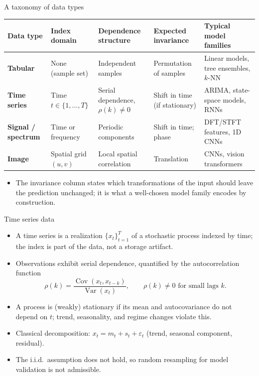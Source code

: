 \begin{frame}{A taxonomy of data types}
\begingroup\footnotesize
\begin{tabularx}{\textwidth}{>{\bfseries}l >{\raggedright\arraybackslash}X >{\raggedright\arraybackslash}X >{\raggedright\arraybackslash}X >{\raggedright\arraybackslash}X}
Data type & Index domain & Dependence structure & Expected invariance & Typical model families \\
\toprule
Tabular & None (sample set) & Independent samples & Permutation of samples & Linear models, tree ensembles, $k$-NN \\
\addlinespace[0.5em]
Time series & Time $t \in \{1,\dots,T\}$ & Serial dependence, $\rho(k) \neq 0$ & Shift in time (if stationary) & ARIMA, state-space models, RNNs \\
\addlinespace[0.5em]
Signal / spectrum & Time or frequency & Periodic components & Shift in time; phase & DFT/STFT features, 1D CNNs \\
\addlinespace[0.5em]
Image & Spatial grid $(u, v)$ & Local spatial correlation & Translation & CNNs, vision transformers \\
\bottomrule
\end{tabularx}
\endgroup
\vspace{0.6em}
\begin{itemize}
\item The invariance column states which transformations of the input should leave the prediction unchanged; it is what a well-chosen model family encodes by construction.
\end{itemize}
\coursefooter
\end{frame}

\begin{frame}{Time series data}
\begin{itemize}
\item A time series is a realization $\{x_t\}_{t=1}^{T}$ of a stochastic process indexed by time; the index is part of the data, not a storage artifact.
\item Observations exhibit serial dependence, quantified by the autocorrelation function
\[
\rho(k) = \frac{\operatorname{Cov}(x_t, x_{t-k})}{\operatorname{Var}(x_t)}, \qquad \rho(k) \neq 0 \text{ for small lags } k.
\]
\item A process is (weakly) stationary if its mean and autocovariance do not depend on $t$; trend, seasonality, and regime changes violate this.
\item Classical decomposition: $x_t = m_t + s_t + \varepsilon_t$ (trend, seasonal component, residual).
\item The i.i.d.\ assumption does not hold, so random resampling for model validation is not admissible.
\end{itemize}
\coursefooter
\end{frame}

